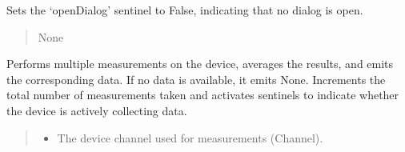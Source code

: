 \documentclass[letterpaper,10pt,english]{sphinxmanual}
\begin{document}
\begin{fulllineitems}
\begin{fulllineitems}
\label{\detokenize{StartStopHist:StartStopHist.WorkerThreadStartStopHistogram.dialogIsOpen}}
\pysigstartsignatures
{}
\pysigstopsignatures
\sphinxAtStartPar
Sets the ‘openDialog’ sentinel to False, indicating that no dialog is open.
\begin{quote}\begin{description}
\sphinxAtStartPar
None

\end{description}\end{quote}

\end{fulllineitems}


\begin{fulllineitems}
\label{\detokenize{StartStopHist:StartStopHist.WorkerThreadStartStopHistogram.dialogSignal}}
\pysigstartsignatures
{}
\pysigstopsignatures
\end{fulllineitems}


\begin{fulllineitems}
\label{\detokenize{StartStopHist:StartStopHist.WorkerThreadStartStopHistogram.getNewData}}
\pysigstartsignatures
{}
\pysigstopsignatures
\sphinxAtStartPar
Performs multiple measurements on the device, averages the results, and emits the corresponding data.
If no data is available, it emits None. Increments the total number of measurements taken and activates sentinels
to indicate whether the device is actively collecting data.
\begin{quote}\begin{description}
\begin{itemize}
\item {} 
\sphinxAtStartPar
{} \textendash{} The device channel used for measurements (Channel).


\end{itemize}
\end{description}
\end{quote}
\end{fulllineitems}
\end{fulllineitems}
\end{document}
